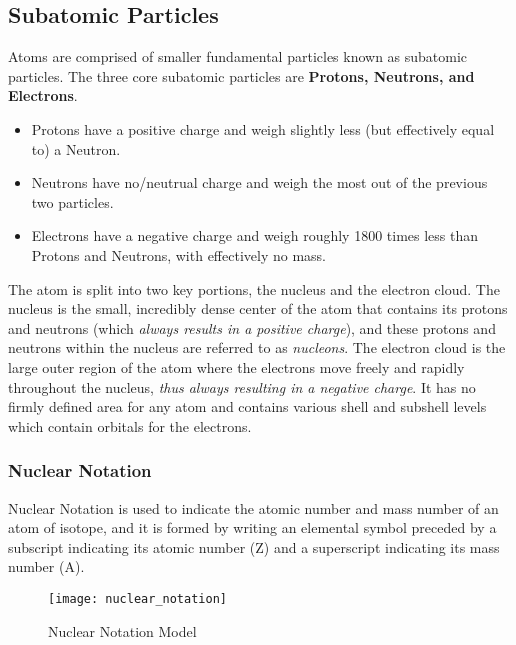 \subsection{Subatomic Particles}

\begin{defn}
Atoms are comprised of smaller fundamental particles known as subatomic particles. The three core subatomic particles are \textbf{Protons, Neutrons, and Electrons}.

\begin{itemize}
\item Protons have a positive charge and weigh slightly less (but effectively equal to) a Neutron.
\item Neutrons have no/neutrual charge and weigh the most out of the previous two particles.
\item Electrons have a negative charge and weigh roughly 1800 times less than Protons and Neutrons, with effectively no mass.
\end{itemize}
\end{defn}

\noindent
The atom is split into two key portions, the nucleus and the electron cloud. The nucleus is the small, incredibly dense center of the atom that contains its protons and neutrons (which \textit{always results in a positive charge}), and these protons and neutrons within the nucleus are referred to as \textit{nucleons}. The electron cloud is the large outer region of the atom where the electrons move freely and rapidly throughout the nucleus, \textit{thus always resulting in a negative charge}. It has no firmly defined area for any atom and contains various shell and subshell levels which contain orbitals for the electrons.

\subsubsection{Nuclear Notation}

Nuclear Notation is used to indicate the atomic number and mass number of an atom of isotope, and it is formed by writing an elemental symbol preceded by a subscript indicating its atomic number (Z) and a superscript indicating its mass number (A). \\

\noindent
{}

\begin{figure}[H]
	\centering
	\texttt{[image: nuclear\_notation]}
	\caption{Nuclear Notation Model}
\end{figure}


